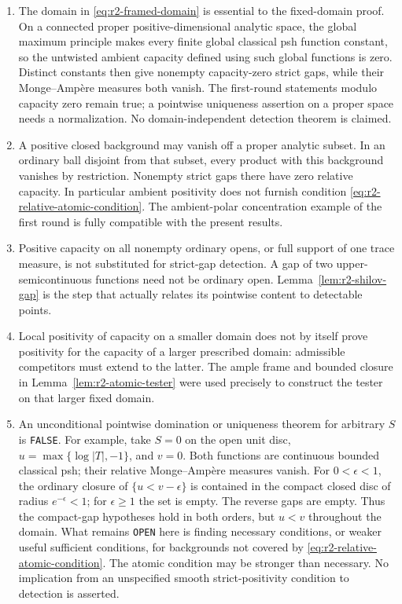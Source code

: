 \documentclass[11pt,a4paper]{article}
\numberwithin{equation}{section}
\theoremstyle{definition}
\theoremstyle{remark}
\begin{document}
\begin{enumerate}
\item The domain in \eqref{eq:r2-framed-domain} is essential to the
fixed-domain proof. On a connected proper positive-dimensional
analytic space, the global maximum principle makes every finite
global classical psh function constant, so the untwisted ambient
capacity defined using such global functions is zero. Distinct
constants then give nonempty capacity-zero strict gaps, while their
Monge--Amp\`ere measures both vanish. The first-round statements modulo
capacity zero remain true; a pointwise uniqueness assertion on a proper
space needs a normalization. No domain-independent detection theorem
is claimed.

\item A positive closed background may vanish off a proper analytic
subset. In an ordinary ball disjoint from that subset, every product
with this background vanishes by restriction. Nonempty strict gaps
there have zero relative capacity. In particular ambient positivity
does not furnish condition \eqref{eq:r2-relative-atomic-condition}.
The ambient-polar concentration example of the first round is fully
compatible with the present results.

\item Positive capacity on all nonempty ordinary opens, or full
support of one trace measure, is not substituted for strict-gap
detection. A gap of two upper-semicontinuous functions need not be
ordinary open. Lemma~\ref{lem:r2-shilov-gap} is the step that actually
relates its pointwise content to detectable points.

\item Local positivity of capacity on a smaller domain does not by
itself prove positivity for the capacity of a larger prescribed
domain: admissible competitors must extend to the latter. The ample
frame and bounded closure in Lemma~\ref{lem:r2-atomic-tester} were used
precisely to construct the tester on that larger fixed domain.

\item An unconditional pointwise domination or uniqueness theorem for
arbitrary $S$ is \texttt{FALSE}. For example, take $S=0$ on the open
unit disc, $u=\max\{\log|T|,-1\}$, and $v=0$. Both functions are
continuous bounded classical psh; their relative Monge--Amp\`ere
measures vanish. For $0<\epsilon<1$, the ordinary closure of
$\{u<v-\epsilon\}$ is contained in the compact closed disc of radius
$e^{-\epsilon}<1$;
for $\epsilon\geq1$ the set is empty. The reverse gaps are empty.
Thus the compact-gap hypotheses hold in both orders, but $u<v$
throughout the domain. What remains \texttt{OPEN} here is finding
necessary conditions, or weaker useful sufficient conditions, for
backgrounds not covered by
\eqref{eq:r2-relative-atomic-condition}. The atomic condition may be
stronger than necessary. No implication from an unspecified smooth
strict-positivity condition to detection is asserted.
\end{enumerate}
\end{document}
